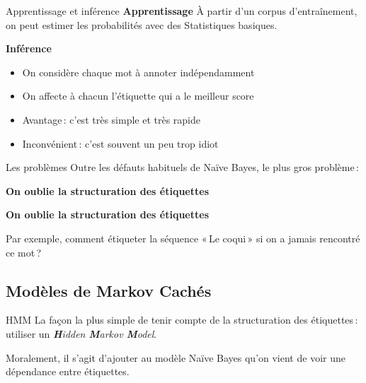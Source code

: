 \documentclass[../allslides.tex]{subfiles}
\begin{document}
\begin{frame}{Apprentissage et inférence}
	\textbf{Apprentissage} À partir d'un corpus d'entraînement, on peut estimer les probabilités avec des Statistiques basiques.

	\textbf{Inférence}
	\begin{itemize}
		\item On considère chaque mot à annoter indépendamment
		\item On affecte à chacun l'étiquette qui a le meilleur score
	\end{itemize}

	\begin{itemize}
		\item Avantage : c'est très simple et très rapide
		\item Inconvénient : c'est souvent un peu trop idiot
	\end{itemize}
\end{frame}

\begin{frame}{Les problèmes}
	Outre les défauts habituels de Naïve Bayes, le plus gros problème :

	\vspace{\bigskipamount}
	\begin{overprint}
			\begin{center}
				\Huge
				\textbf{On oublie la structuration des étiquettes}
			\end{center}
			\begin{center}
				\textbf{On oublie la structuration des étiquettes}
			\end{center}

			Par exemple, comment étiqueter la séquence « Le coqui » si on a jamais rencontré ce mot ?

	\end{overprint}
\end{frame}

\subsection{Modèles de Markov Cachés}
\begin{frame}{HMM}
	La façon la plus simple de tenir compte de la structuration des étiquettes : utiliser un \alert{\textit{\textbf{H}idden \textbf{M}arkov \textbf{M}odel}}.

	Moralement, il s'agit d'ajouter au modèle Naïve Bayes qu'on vient de voir une dépendance entre étiquettes.
\end{frame}
\end{document}
